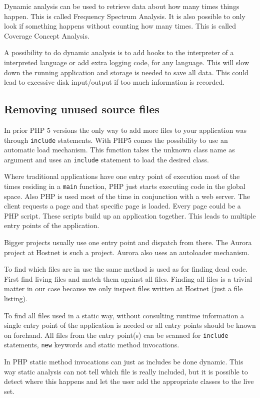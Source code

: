 \documentclass[a4paper,10pt,twocolumn]{article}
\begin{document}
Dynamic analysis can be used to retrieve data about how many times things happen. This is called Frequency Spectrum Analysis. It is also possible to only look if something happens without counting how many times. This is called Coverage Concept Analysis\cite{ball1999}.

A possibility to do dynamic analysis is to add hooks to the interpreter of a interpreted language or add extra logging code, for any language. This will slow down the running application and storage is needed to save all data. This could lead to excessive disk input/output if too much information is recorded.

\subsection{Removing unused source files}
In prior PHP 5 versions the only way to add more files to your application was through \verb|include| statements\cite{php}. With PHP5 comes the possibility to use an automatic load mechanism. This function takes the unknown class name as argument and uses an \verb|include| statement to load the desired class.

Where traditional applications have one entry point of execution most of the times residing in a \verb|main| function, PHP just starts executing code in the global space. Also PHP is used most of the time in conjunction with a web server. The client requests a page and that specific page is loaded. Every page could be a PHP script. These scripts build up an application together. This leads to multiple entry points of the application.

Bigger projects usually use one entry point and dispatch from there. The Aurora project at Hostnet is such a project. Aurora also uses an autoloader mechanism. 

To find which files are in use the same method is used as for finding dead code. First find living files and match them against all files. Finding all files is a trivial matter in our case because we only inspect files written at Hostnet (just a file listing). 

To find all files used in a static way, without consulting runtime information a single entry point of the application is needed or all entry points should be known on forehand. All files from the entry point(s) can be scanned for \verb|include| statements, \verb|new| keywords and static method invocations.

In PHP static method invocations can just as includes be done dynamic. This way static analysis can not tell which file is really included, but it is possible to detect where this happens and let the user add the appropriate classes to the live set.
\end{document}
